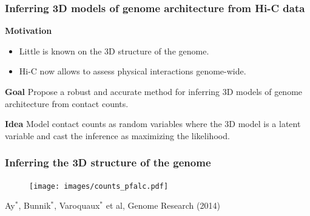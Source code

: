 \documentclass[11pt,xcolor=dvipsnames]{beamer}
\begin{document}
\begin{frame}
\frametitle{Inferring 3D models of genome architecture from Hi-C data}
{\color{Blue} \textbf{Motivation}}
\begin{itemize}[label={$\bullet$}]
\item Little is known on the 3D structure of the genome.
\item Hi-C now allows to assess physical interactions genome-wide.
\end{itemize}

\vspace{1em}
{\color{Blue} \textbf{Goal}} Propose a robust and accurate method for
inferring 3D models of genome architecture from contact counts.

\vspace{1em}
{\color{Blue} \textbf{Idea}} Model contact counts as random variables
where the 3D model is a latent variable and cast the inference as maximizing
the likelihood.

\end{frame}


\begin{frame}
\frametitle{Inferring the 3D structure of the genome}

\begin{figure}
\centering
\texttt{[image: images/counts\_pfalc.pdf]}
\end{figure}
\begin{flushright}
\tiny Ay$^*$, Bunnik$^*$, {\color{red} Varoquaux$^*$} et
al, Genome Research (2014)
\end{flushright}


\begin{overlayarea}{12cm}{4cm}
\end{overlayarea}
\end{frame}
\end{document}
